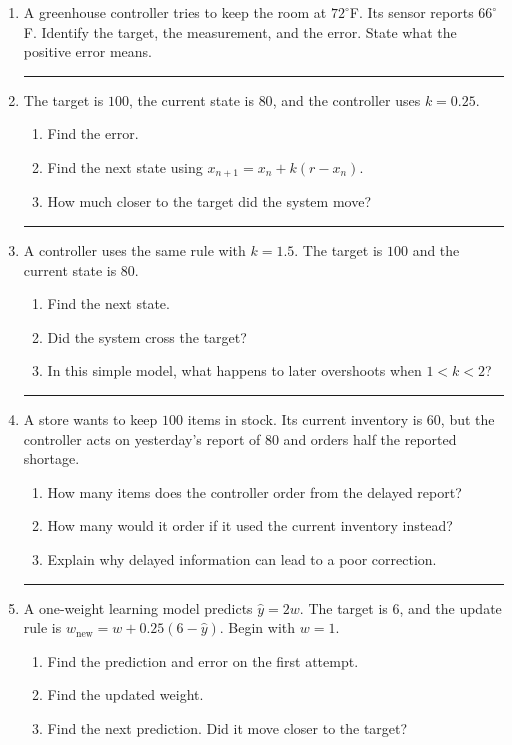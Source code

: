 \documentclass[12pt]{article}
\newcommand{\answerline}{\par\vspace{0.38in}\hrule\vspace{0.12in}}
\begin{document}
\begin{enumerate}
\item A greenhouse controller tries to keep the room at $72^\circ$F. Its sensor reports $66^\circ$F. Identify the target, the measurement, and the error. State what the positive error means.
\answerline
\item The target is $100$, the current state is $80$, and the controller uses $k=0.25$.
  \begin{enumerate}[label=(\alph*)]
  \item Find the error.
  \item Find the next state using $x_{n+1}=x_n+k(r-x_n)$.
  \item How much closer to the target did the system move?
  \end{enumerate}
\answerline
\item A controller uses the same rule with $k=1.5$. The target is $100$ and the current state is $80$.
  \begin{enumerate}[label=(\alph*)]
  \item Find the next state.
  \item Did the system cross the target?
  \item In this simple model, what happens to later overshoots when $1<k<2$?
  \end{enumerate}
\answerline
\item A store wants to keep $100$ items in stock. Its current inventory is $60$, but the controller acts on yesterday's report of $80$ and orders half the reported shortage.
  \begin{enumerate}[label=(\alph*)]
  \item How many items does the controller order from the delayed report?
  \item How many would it order if it used the current inventory instead?
  \item Explain why delayed information can lead to a poor correction.
  \end{enumerate}
\answerline
\item A one-weight learning model predicts $\widehat y=2w$. The target is $6$, and the update rule is $w_{\text{new}}=w+0.25(6-\widehat y)$. Begin with $w=1$.
  \begin{enumerate}[label=(\alph*)]
  \item Find the prediction and error on the first attempt.
  \item Find the updated weight.
  \item Find the next prediction. Did it move closer to the target?
  \end{enumerate}
\end{enumerate}
\end{document}
